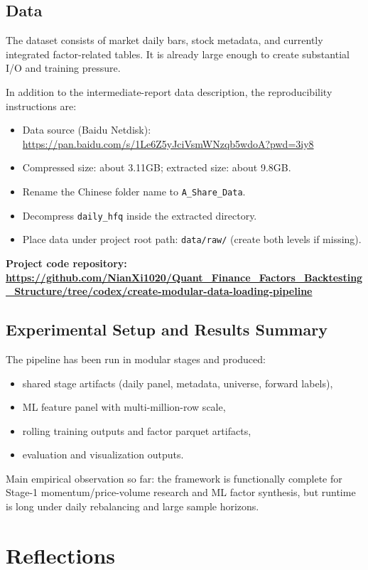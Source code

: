 \documentclass[letterpaper,11pt]{article}
\begin{document}
\subsection{Data}
The dataset consists of market daily bars, stock metadata, and currently integrated factor-related tables. It is already large enough to create substantial I/O and training pressure.

In addition to the intermediate-report data description, the reproducibility instructions are:
\begin{itemize}
    \item Data source (Baidu Netdisk): \url{https://pan.baidu.com/s/1Le6Z5yJciVsmWNzqb5wdoA?pwd=3iy8}
    \item Compressed size: about 3.11GB; extracted size: about 9.8GB.
    \item Rename the Chinese folder name to \texttt{A\_Share\_Data}.
    \item Decompress \texttt{daily\_hfq} inside the extracted directory.
    \item Place data under project root path: \texttt{data/raw/} (create both levels if missing).
\end{itemize}

\textbf{Project code repository: \url{https://github.com/NianXi1020/Quant_Finance_Factors_Backtesting_Structure/tree/codex/create-modular-data-loading-pipeline}}

\subsection{Experimental Setup and Results Summary}
The pipeline has been run in modular stages and produced:
\begin{itemize}
    \item shared stage artifacts (daily panel, metadata, universe, forward labels),
    \item ML feature panel with multi-million-row scale,
    \item rolling training outputs and factor parquet artifacts,
    \item evaluation and visualization outputs.
\end{itemize}

Main empirical observation so far: the framework is functionally complete for Stage-1 momentum/price-volume research and ML factor synthesis, but runtime is long under daily rebalancing and large sample horizons.

\section{Reflections}
\end{document}
